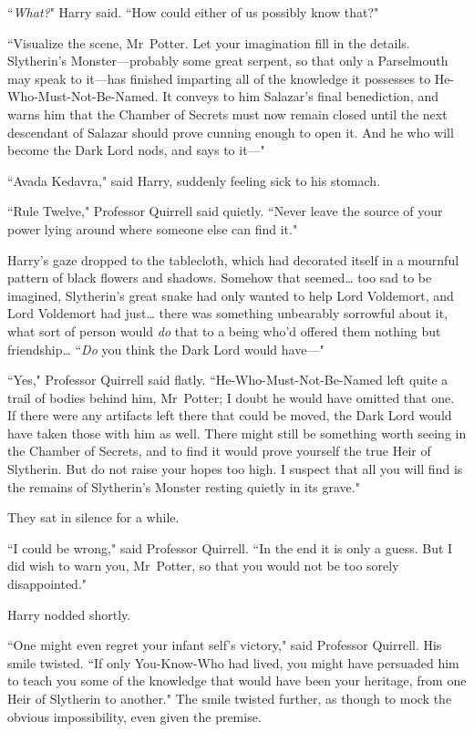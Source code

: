 ``\emph{What?}" Harry said. ``How could either of us possibly know that?"

``Visualize the scene, Mr~Potter. Let your imagination fill in the details. Slytherin's Monster—probably some great serpent, so that only a Parselmouth may speak to it—has finished imparting all of the knowledge it possesses to He-Who-Must-Not-Be-Named. It conveys to him Salazar's final benediction, and warns him that the Chamber of Secrets must now remain closed until the next descendant of Salazar should prove cunning enough to open it. And he who will become the Dark Lord nods, and says to it—"

``Avada Kedavra," said Harry, suddenly feeling sick to his stomach.

``Rule Twelve," Professor Quirrell said quietly. ``Never leave the source of your power lying around where someone else can find it."

Harry's gaze dropped to the tablecloth, which had decorated itself in a mournful pattern of black flowers and shadows. Somehow that seemed{\ldots} too sad to be imagined, Slytherin's great snake had only wanted to help Lord Voldemort, and Lord Voldemort had just{\ldots} there was something unbearably sorrowful about it, what sort of person would \emph{do} that to a being who'd offered them nothing but friendship{\ldots} ``\emph{Do} you think the Dark Lord would have—"

``Yes," Professor Quirrell said flatly. ``He-Who-Must-Not-Be-Named left quite a trail of bodies behind him, Mr~Potter; I doubt he would have omitted that one. If there were any artifacts left there that could be moved, the Dark Lord would have taken those with him as well. There might still be something worth seeing in the Chamber of Secrets, and to find it would prove yourself the true Heir of Slytherin. But do not raise your hopes too high. I suspect that all you will find is the remains of Slytherin's Monster resting quietly in its grave."

They sat in silence for a while.

``I could be wrong," said Professor Quirrell. ``In the end it is only a guess. But I did wish to warn you, Mr~Potter, so that you would not be too sorely disappointed."

Harry nodded shortly.

``One might even regret your infant self's victory," said Professor Quirrell. His smile twisted. ``If only You-Know-Who had lived, you might have persuaded him to teach you some of the knowledge that would have been your heritage, from one Heir of Slytherin to another." The smile twisted further, as though to mock the obvious impossibility, even given the premise.

